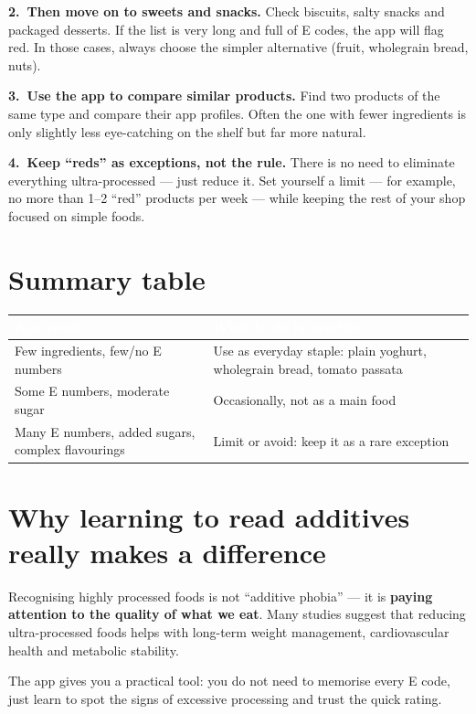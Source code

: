 \documentclass[a5paper,12pt,oneside,openany]{book}
\begin{document}
\textbf{2.~Then move on to sweets and snacks.} Check biscuits, salty
snacks and packaged desserts. If the list is very long and full of
E codes, the app will flag red. In those cases, always choose the simpler
alternative (fruit, wholegrain bread, nuts).

\textbf{3.~Use the app to compare similar products.} Find two products of
the same type and compare their app profiles. Often the one with fewer
ingredients is only slightly less eye-catching on the shelf but far more
natural.

\textbf{4.~Keep ``reds'' as exceptions, not the rule.} There is no need
to eliminate everything ultra-processed --- just reduce it. Set yourself
a limit --- for example, no more than 1--2 ``red'' products per week ---
while keeping the rest of your shop focused on simple foods.

\section{Summary table}

{\small
\begin{tabularx}{\textwidth}{|L|L|}
\hline
{}\textcolor{white}{\textbf{App result}}
  & \textcolor{white}{\textbf{What to do in practice}} \\
\hline
Few ingredients, few/no E numbers
  & Use as everyday staple: plain yoghurt, wholegrain bread, tomato passata \\
\hline
Some E numbers, moderate sugar
  & Occasionally, not as a main food \\
\hline
Many E numbers, added sugars, complex flavourings
  & Limit or avoid: keep it as a rare exception \\
\hline
\end{tabularx}
}

\section{Why learning to read additives really makes a difference}

Recognising highly processed foods is not ``additive phobia'' --- it is
\textbf{paying attention to the quality of what we eat}. Many studies
suggest that reducing ultra-processed foods helps with long-term weight
management, cardiovascular health and metabolic stability.

The app gives you a practical tool: you do not need to memorise every
E code, just learn to spot the signs of excessive processing and trust
the quick rating.
\end{document}
